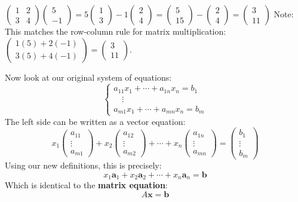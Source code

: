 \begin{example}
$\begin{pmatrix} 1 & 2 \\ 3 & 4 \end{pmatrix} \begin{pmatrix} 5 \\ -1 \end{pmatrix}
= 5 \begin{pmatrix} 1 \\ 3 \end{pmatrix} - 1 \begin{pmatrix} 2 \\ 4 \end{pmatrix}
= \begin{pmatrix} 5 \\ 15 \end{pmatrix} - \begin{pmatrix} 2 \\ 4 \end{pmatrix}
= \begin{pmatrix} 3 \\ 11 \end{pmatrix}$
Note: This matches the row-column rule for matrix multiplication:
$\begin{pmatrix} 1(5) + 2(-1) \\ 3(5) + 4(-1) \end{pmatrix} = \begin{pmatrix} 3 \\ 11 \end{pmatrix}$.
\end{example}

Now look at our original system of equations:
\[
\begin{cases}
a_{11}x_1 + \cdots + a_{1n}x_n = b_1\\
\quad \vdots \\
a_{m1}x_1 + \cdots + a_{mn}x_n = b_m
\end{cases}
\]
The left side can be written as a vector equation:
\[
x_1 \begin{pmatrix} a_{11} \\ \vdots \\ a_{m1} \end{pmatrix} +
x_2 \begin{pmatrix} a_{12} \\ \vdots \\ a_{m2} \end{pmatrix} + \cdots +
x_n \begin{pmatrix} a_{1n} \\ \vdots \\ a_{mn} \end{pmatrix}
=
\begin{pmatrix} b_1 \\ \vdots \\ b_m
\end{pmatrix}
\]
Using our new definitions, this is precisely:
\[ x_1\mathbf{a}_1 + x_2\mathbf{a}_2 + \cdots + x_n\mathbf{a}_n = \mathbf{b} \]
Which is identical to the \textbf{matrix equation}:
\[ A\mathbf{x} = \mathbf{b} \]

